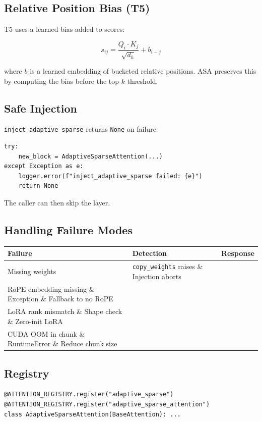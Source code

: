 \subsection{Relative Position Bias (T5)}

T5 uses a learned bias added to scores:

\[
s_{ij} = \frac{Q_i \cdot K_j}{\sqrt{d_h}} + b_{i-j}
\]

where $b$ is a learned embedding of bucketed relative positions. ASA preserves 
this by computing the bias before the top-$k$ threshold.

\subsection{Safe Injection}

\texttt{inject\_adaptive\_sparse} returns \texttt{None} on failure:

\begin{lstlisting}
try:
    new_block = AdaptiveSparseAttention(...)
except Exception as e:
    logger.error(f"inject_adaptive_sparse failed: {e}")
    return None
\end{lstlisting}

The caller can then skip the layer.

\subsection{Handling Failure Modes}

\begin{table}[H]
\centering
\small
\begin{tabular}{lll}
\toprule
\textbf{Failure} & \textbf{Detection} & \textbf{Response} \\
\midrule
Missing weights & \texttt{copy\_weights} raises \& Injection aborts \\
RoPE embedding missing \& Exception \& Fallback to no RoPE \\
LoRA rank mismatch \& Shape check \& Zero-init LoRA \\
CUDA OOM in chunk \& RuntimeError \& Reduce chunk size \\
\bottomrule
\end{tabular}
\end{table}

\subsection{Registry}

\begin{lstlisting}
@ATTENTION_REGISTRY.register("adaptive_sparse")
@ATTENTION_REGISTRY.register("adaptive_sparse_attention")
class AdaptiveSparseAttention(BaseAttention): ...
\end{lstlisting}

